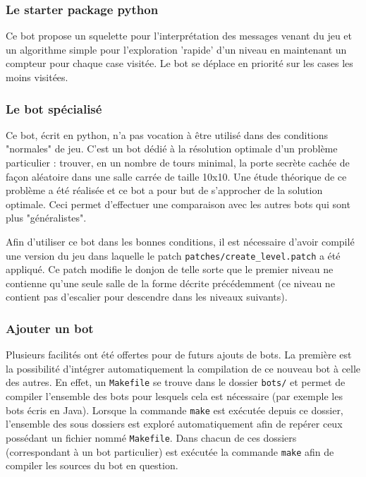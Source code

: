 \documentclass[a4paper,12pt]{article}
\begin{document}
\subsubsection{Le starter package python}

Ce bot propose un squelette pour l'interprétation des messages venant du jeu
et un algorithme simple pour l'exploration 'rapide' d'un niveau en maintenant
un compteur pour chaque case visitée. Le bot se déplace en priorité sur les
cases les moins visitées.

\subsubsection{Le bot spécialisé}

Ce bot, écrit en python, n'a pas vocation à être utilisé dans des conditions
"normales" de jeu. C'est un bot dédié à la résolution optimale d'un problème
particulier : trouver, en un nombre de tours minimal, la porte secrète cachée
de façon aléatoire dans une salle carrée de taille 10x10. Une étude théorique
de ce problème a été réalisée et ce bot a pour but de s'approcher de la
solution optimale. Ceci permet d'effectuer une comparaison avec les autres
bots qui sont plus "généralistes".

Afin d'utiliser ce bot dans les bonnes conditions, il est nécessaire d'avoir
compilé une version du jeu dans laquelle le patch
{\verb|patches/create_level.patch|} a été appliqué. Ce patch modifie le donjon
de telle sorte que le premier niveau ne contienne qu'une seule salle de la
forme décrite précédemment (ce niveau ne contient pas d'escalier pour
descendre dans les niveaux suivants).

\subsubsection{Ajouter un bot}

Plusieurs facilités ont été offertes pour de futurs ajouts de bots. La
première est la possibilité d'intégrer automatiquement la compilation de ce
nouveau bot à celle des autres. En effet, un \verb!Makefile! se trouve dans le
dossier \verb!bots/! et permet de compiler l'ensemble des bots pour lesquels
cela est nécessaire (par exemple les bots écris en Java). Lorsque la
commande \verb!make! est exécutée depuis ce dossier, l'ensemble des sous
dossiers
est exploré automatiquement afin de repérer ceux possédant un fichier nommé
\verb!Makefile!. Dans chacun de ces dossiers (correspondant à un bot
particulier) est exécutée la commande \verb!make! afin de compiler les sources
du bot en question.
\end{document}
